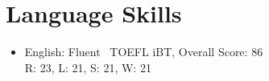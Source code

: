 \documentclass[letter,20pt]{article}
\begin{document}
\section{\textbf{Language Skills}}	    
\vspace{5pt}

\begin{itemize}[leftmargin=3ex]
	\item   {{English:}} Fluent \textbar\ TOEFL iBT, Overall Score: 86 \\ 
	\hspace*{5pt}	R: 23, L: 21, S: 21, W: 21   \\
\end{itemize}
	    
\end{document}
